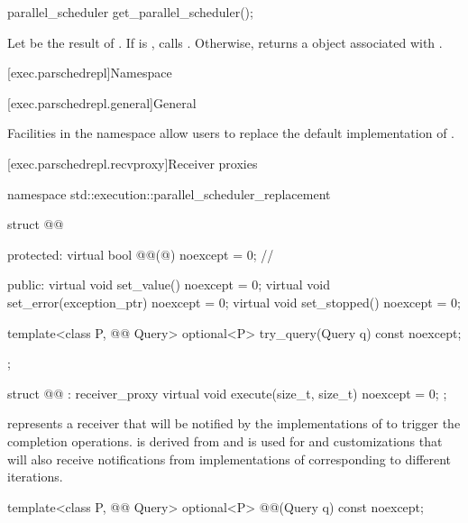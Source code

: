 %
\begin{itemdecl}
parallel_scheduler get_parallel_scheduler();
\end{itemdecl}

\begin{itemdescr}
\pnum
\effects
Let  be the result of .
If  is ,
calls .
Otherwise, returns a  object
associated with .
\end{itemdescr}

[exec.parschedrepl]{Namespace }

[exec.parschedrepl.general]{General}

\pnum
Facilities in the  namespace
allow users to replace the default implementation of .

[exec.parschedrepl.recvproxy]{Receiver proxies}

\begin{codeblock}
namespace std::execution::parallel_scheduler_replacement {
  struct @@ {
  protected:
    virtual bool @@(@\unspecnc@) noexcept = 0;   // \expos

  public:
    virtual void set_value() noexcept = 0;
    virtual void set_error(exception_ptr) noexcept = 0;
    virtual void set_stopped() noexcept = 0;

    template<class P, @@ Query>
      optional<P> try_query(Query q) const noexcept;
  };

  struct @@ : receiver_proxy {
    virtual void execute(size_t, size_t) noexcept = 0;
  };
}
\end{codeblock}

\pnum
{} represents a receiver
that will be notified
by the implementations of 
to trigger the completion operations.
 is derived from  and
is used for  and  customizations
that will also receive notifications
from implementations of 
corresponding to different iterations.

\begin{itemdecl}
template<class P, @@ Query>
  optional<P> @@(Query q) const noexcept;
\end{itemdecl}

